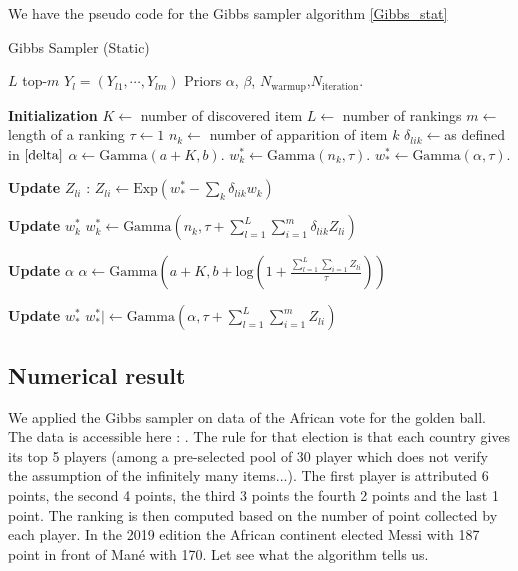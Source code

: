 \documentclass{article}
\begin{document}
We have the pseudo code for the Gibbs sampler algorithm \ref{Gibbs_stat}

\begin{algorithm}
\caption{Gibbs Sampler (Static)}
\label{Gibbs_stat}
\begin{algorithmic}
\REQUIRE $L$ top-$m$ $Y_{l}=(Y_{l1},\cdots,Y_{lm})$ Priors $\alpha$, $\beta$, $N_\text{warmup}$,$N_\text{iteration}$.

\STATE \textbf{Initialization}
\STATE $K \leftarrow$ number of discovered item
\STATE $L \leftarrow$ number of rankings
\STATE $m \leftarrow$ length of a ranking
\STATE $\tau \leftarrow 1$
\STATE $n_k \leftarrow$ number of apparition of item $k$
\STATE $\delta_{lik} \leftarrow $as defined in $\ref{delta}$
\STATE $\alpha\leftarrow\text{Gamma}(a+K,b)$.
\STATE $w^*_{k}\leftarrow \text{Gamma}(n_k,\tau)$.
\STATE $w^*_*\leftarrow \text{Gamma}(\alpha,\tau)$.


\STATE


\STATE \textbf{Update }$Z_{li}$ :
\STATE $Z_{li} \leftarrow \text{Exp}\left(w^*_*-\sum_{k}\delta_{lik} w_k \right)$
\ENDFOR

\STATE \textbf{Update }$w^*_k$
\STATE $w^*_k \leftarrow \text{Gamma}\left(n_k,\tau +\sum_{l=1}^L\sum_{i=1}^m \delta_{lik}Z_{li}\right)$
\ENDFOR

\STATE \textbf{Update }$\alpha$
\STATE $\alpha \leftarrow \text{Gamma}\left(a+K , b + \text{log}\left(1 +\frac{\sum_{l=1}^L\sum_{i=1}Z_{li}}{\tau} \right) \right)$

\STATE \textbf{Update }$w_*^*$
$w^*_* | \leftarrow \text{Gamma}\left(\alpha,\tau +\sum_{l=1}^L\sum_{i=1}^m Z_{li}\right)$

\ENDFOR
\end{algorithmic}
\end{algorithm}


\subsection{Numerical result}
We applied the Gibbs sampler on data of the African vote for the golden ball. The data is accessible here : \cite{databallon}. The rule for that election is that each country gives its top 5 players (among a pre-selected pool of 30 player which does not verify the assumption of the infinitely many items...). The first player is attributed 6 points, the second 4 points, the third 3 points the fourth 2 points and the last 1 point. The ranking is then computed based on the number of point collected by each player. In the 2019 edition the African continent elected Messi with 187 point in front of Mané with 170. Let see what the algorithm tells us.
\end{document}
